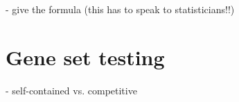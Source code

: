 - give the formula (this has to speak to statisticians!!)

\section{Gene set testing}\label{sec:genesets}

- self-contained vs. competitive

%
%
